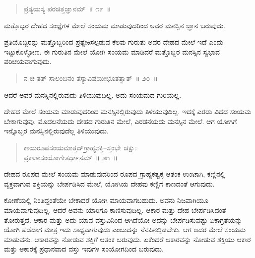 \vspace{-0.3cm}

\begin{verse}
ಪ್ರತ್ಯಯಸ್ಯ ಪರಚಿತ್ತಜ್ಞಾನಮ್​~॥ ೧೯~॥
\end{verse}

\vspace{-0.3cm}

ಮತ್ತೊಬ್ಬರ ದೇಹದ ಸಂಜ್ಞೆಗಳ ಮೇಲೆ ಸಂಯಮ ಮಾಡುವುದರಿಂದ ಅವರ ಮನಸ್ಸಿನ ಜ್ಞಾನ ಬರುವುದು. 

ಪ್ರತಿಯೊಬ್ಬರನ್ನು ಮತ್ತೊಬ್ಬರಿಂದ ಪ್ರತ್ಯೇಕಿಸಲ್ಪಡುವ ಕೆಲವು ಗುರುತು ಅವರ ದೇಹದ ಮೇಲೆ ಇದೆ ಎಂದು ಇಟ್ಟುಕೊಳ್ಳೋಣ. ಈ ಗುರುತಿನ ಮೇಲೆ ಯೋಗಿ ಸಂಯಮ ಮಾಡಿದರೆ ಮತ್ತೊಬ್ಬರ ಮನಸ್ಸಿನ ಸ್ವಭಾವ ಪರಿಚಯವಾಗುವುದು. 

\vspace{-0.3cm}

\begin{verse}
ನ ಚ ತತ್​ ಸಾಲಂಬನಂ ತಸ್ಯಾವಿಷಯೀಭೂತತ್ವಾತ್​~॥ ೨೦~॥
\end{verse}

\vspace{-0.3cm}

ಆದರೆ ಅವರ ಮನಸ್ಸಿನಲ್ಲಿರುವುದು ತಿಳಿಯುವುದಿಲ್ಲ. ಅದು ಸಂಯಮದ ಗುರಿಯಲ್ಲ. 

ದೇಹದ ಮೇಲೆ ಸಂಯಮ ಮಾಡುವುದರಿಂದ ಮನಸ್ಸಿನಲ್ಲಿರುವುದು ತಿಳಿಯುವುದಿಲ್ಲ. ಇದಕ್ಕೆ ಎರಡು ವಿಧದ ಸಂಯಮ ಬೇಕಾಗುವುವು. ಮೊದಲನೆಯದು ದೇಹದ ಗುರುತಿನ ಮೇಲೆ, ಎರಡನೆಯದು ಮನಸ್ಸಿನ ಮೇಲೆ. ಆಗ ಯೋಗಿಗೆ ಇನ್ನೊಬ್ಬರ ಮನಸ್ಸಿನಲ್ಲಿರುವುದೆಲ್ಲ ತಿಳಿಯುವುದು. 

\vspace{-0.3cm}

\begin{verse}
ಕಾಯರೂಪಸಂಯಮಾತ್ತದ್​ಗ್ರಾಹ್ಯಶಕ್ತಿ–ಸ್ತಂಭೇ ಚಕ್ಷುಃ\\ಪ್ರಕಾಶಾಸಂಯೋಗೇತರ್ಧಾನಮ್​~॥ ೨೧~॥
\end{verse}

\vspace{-0.3cm}

ದೇಹದ ರೂಪದ ಮೇಲೆ ಸಂಯಮ ಮಾಡುವುದರಿಂದ ರೂಪದ ಗ್ರಾಹ್ಯಕತ್ವಕ್ಕೆ ಆತಂಕ ಉಂಟಾಗಿ, ಕಣ್ಣಿನಲ್ಲಿ ವ್ಯಕ್ತವಾಗುವ ಶಕ್ತಿಯನ್ನು ಬೇರ್ಪಡಿಸಿದ ಮೇಲೆ, ಯೋಗಿಯ ದೇಹವು ಕಣ್ಣಿಗೆ ಕಾಣದಂತೆ ಆಗುವುದು. 

ಕೋಣೆಯಲ್ಲಿ ನಿಂತಿದ್ದಂತೆಯೇ ಬೇಕಾದರೆ ಯೋಗಿ ಮಾಯವಾಗಬಹುದು. ಅವನು ನಿಜವಾಗಿಯೂ ಮಾಯವಾಗುವುದಿಲ್ಲ. ಆದರೆ ಅವನು ಯಾರಿಗೂ ಕಾಣಿಸುವುದಿಲ್ಲ. ಆಕಾರ ಮತ್ತು ದೇಹ ಬೇರ್ಪಡಿಸಿದಂತೆ ತೋರುತ್ತದೆ. ಆಕಾರ ಮತ್ತು ಅದು ಯಾವ ವಸ್ತುವಿನಿಂದ ಆಗಿದೆಯೋ ಅದನ್ನು ಬೇರ್ಪಡಿಸುವಷ್ಟು ಏಕಾಗ್ರತೆಯನ್ನು ಯೋಗಿ ಪಡೆದಾಗ ಮಾತ್ರ ಇದು ಸಾಧ್ಯವಾಗುವುದು ಎಂಬುದನ್ನು ನೆನಪಿನಲ್ಲಿಡಬೇಕು. ಆಗ ಅದರ ಮೇಲೆ ಸಂಯಮ ಮಾಡುವನು. ಆಕಾರವನ್ನು ನೋಡುವ ಶಕ್ತಿಗೆ ಆತಂಕ ಬರುವುದು. ಏಕೆಂದರೆ ಆಕಾರವನ್ನು ನೋಡುವ ಶಕ್ತಿಯು ಆಕಾರ ಮತ್ತು ಆಕಾರಕ್ಕೆ ಪ್ರಧಾನವಾದ ವಸ್ತು ಇವುಗಳ ಸಂಯೋಗದಿಂದ ಬರುವುದು. 

\vspace{-0.3cm}

